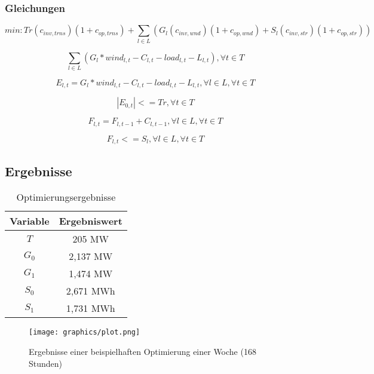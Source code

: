 \subsubsection*{Gleichungen}

\begin{equation}
min: Tr (c_{inv, trns})(1 + c_{op, trns}) + \sum \limits_{l \in L} ( G_{l} (c_{inv, wnd})(1 + c_{op, wnd}) + S_{l} (c_{inv, str})(1 + c_{op, str})) 
\label{fml:zielfunktion}
\end{equation}

\begin{equation}
\sum \limits_{l \in L} (G_{l} * wind_{l, t} - C_{l, t} - load_{l, t} - L_{l, t}), \forall t \in T
\label{fml:constr1}
\end{equation}

\begin{equation}
E_{l, t} = G_{l} * wind_{l, t} - C_{l, t} - load_{l, t} - L_{l, t}, \forall l \in L, \forall t \in T
\label{fml:constr2}
\end{equation}

\begin{equation}
|E_{0, t}| <= Tr , \forall t \in T
\label{fml:constr3}
\end{equation}

\begin{equation}
F_{l, t} = F_{l, t-1} + C_{l, t-1}, \forall l \in L, \forall t \in T
\label{fml:constr4}
\end{equation}

\begin{equation}
F_{l, t} <= S_{l}, \forall l \in L, \forall t \in T
\label{fml:constr5}
\end{equation}


\subsection{Ergebnisse}

\begin{table}[htbp]
\caption{Optimierungsergebnisse}
\begin{center}
\begin{tabular}{c|c} 
Variable & Ergebniswert \\
\hline \hline
$T$ & 205 MW \\
\hline
$G_{0}$ & 2,137 MW \\
\hline
$G_{1}$ & 1,474 MW \\
\hline
$S_{0}$ & 2,671 MWh \\
\hline
$S_{1}$ & 1,731 MWh \\

\end{tabular} 
\end{center}
\label{tab:installiert}
\end{table}

\begin{figure}[htbp]
\centering
\texttt{[image: graphics/plot.png]}
\caption{Ergebnisse einer beispielhaften Optimierung einer Woche (168 Stunden)}
\label{img:ergebnisse}
\end{figure}



